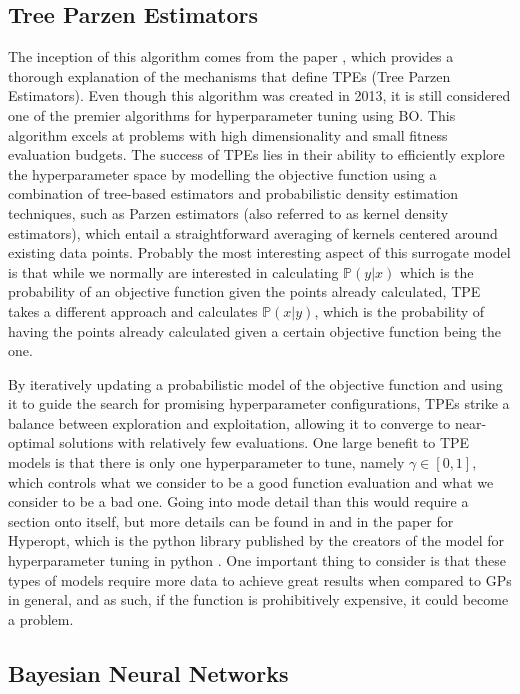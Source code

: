 \subsection{Tree Parzen Estimators}

The inception of this algorithm comes from the paper \cite{bergstra2011algorithms}, which provides a thorough explanation of the mechanisms that define TPEs (Tree Parzen Estimators). Even though this algorithm was created in 2013, it is still considered one of the premier algorithms for hyperparameter tuning using BO. This algorithm excels at problems with high dimensionality and small fitness evaluation budgets. The success of TPEs lies in their ability to efficiently explore the hyperparameter space by modelling the objective function using a combination of tree-based estimators and probabilistic density estimation techniques, such as Parzen estimators (also referred to as kernel density estimators), which entail a straightforward averaging of kernels centered around existing data points. Probably the most interesting aspect of this surrogate model is that while we normally are interested in calculating $\mathbb{P}(y | x)$ which is the probability of an objective function given the points already calculated, TPE takes a different approach and calculates $\mathbb{P}(x | y)$, which is the probability of having the points already calculated given a certain objective function being the  one. 

By iteratively updating a probabilistic model of the objective function and using it to guide the search for promising hyperparameter configurations, TPEs strike a balance between exploration and exploitation, allowing it to converge to near-optimal solutions with relatively few evaluations. One large benefit to TPE models is that there is only one hyperparameter to tune, namely $\gamma \in [0,1]$, which controls what we consider to be a good function evaluation and what we consider to be a bad one. Going into mode detail than this would require a section onto itself, but more details can be found in \cite{bergstra2011algorithms} and in the paper for Hyperopt, which is the python library published by the creators of the model for hyperparameter tuning in python \cite{bergstra2013hyperopt}. One important thing to consider is that these types of models require more data to achieve great results when compared to GPs in general, and as such, if the function is prohibitively expensive, it could become a problem. 

\subsection{Bayesian Neural Networks}

